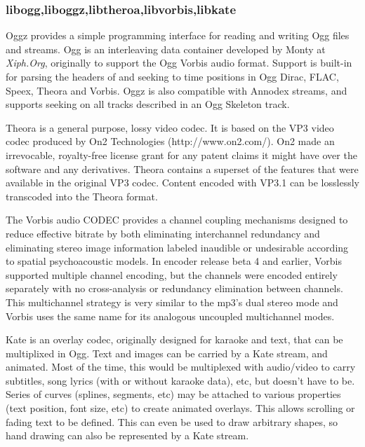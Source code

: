 \subsubsection{libogg,liboggz,libtheroa,libvorbis,libkate}
{
Oggz provides a simple programming interface for reading and writing Ogg files and streams. Ogg is an interleaving data container developed by Monty at \emph{Xiph.Org}, originally to support the Ogg Vorbis audio format.
Support is built-in for parsing the headers of and seeking to time positions in Ogg Dirac, FLAC, Speex, Theora and Vorbis. 
Oggz is also compatible with Annodex streams, and supports seeking on all tracks described in an Ogg Skeleton track.

Theora is a general purpose, lossy video codec. It is based on the VP3 video
codec produced by On2 Technologies (http://www.on2.com/). 
On2 made an irrevocable, royalty-free license grant for any patent claims it might have over the software and any derivatives. 
Theora contains a superset of the features that were available in the original
VP3 codec. Content encoded with VP3.1 can be losslessly transcoded into the
Theora format.\cite{THEORA}

The Vorbis audio CODEC provides a channel coupling mechanisms designed to reduce effective bitrate by both eliminating interchannel redundancy and eliminating stereo image information labeled inaudible or undesirable according to spatial psychoacoustic models.
In encoder release beta 4 and earlier, Vorbis supported multiple channel encoding, but the channels were encoded entirely separately with no cross-analysis or redundancy elimination between channels. This multichannel strategy is very similar to the mp3's dual stereo mode and Vorbis uses the same name for its analogous uncoupled multichannel modes.\cite{VORBIS} 

Kate is an overlay codec, originally designed for karaoke and text, that can be multiplixed in Ogg. Text and images can be carried by a Kate stream, and animated. Most of the time, this would be multiplexed with audio/video to carry subtitles, song lyrics (with or without karaoke data), etc, but doesn't have to be.
Series of curves (splines, segments, etc) may be attached to various properties (text position, font size, etc) to create animated overlays. This allows scrolling or fading text to be defined. This can even be used to draw arbitrary shapes, so hand drawing can also be represented by a Kate stream.\cite{KATE}
}

